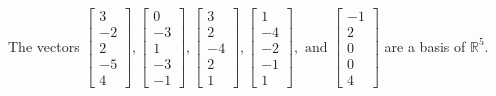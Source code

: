 \begin{exercise}
\begin{exerciseStatement}
  \end{exerciseStatement}
  \begin{exerciseAnswer}
   The vectors \(\left[\begin{array}{r}
3 \\
-2 \\
2 \\
-5 \\
4
\end{array}\right] , \left[\begin{array}{r}
0 \\
-3 \\
1 \\
-3 \\
-1
\end{array}\right] , \left[\begin{array}{r}
3 \\
2 \\
-4 \\
2 \\
1
\end{array}\right] , \left[\begin{array}{r}
1 \\
-4 \\
-2 \\
-1 \\
1
\end{array}\right] , \text{ and } \left[\begin{array}{r}
-1 \\
2 \\
0 \\
0 \\
4
\end{array}\right]\) 
  	 are  a basis of \(\mathbb{R}^5\).
  


  \end{exerciseAnswer}
\end{exercise}
